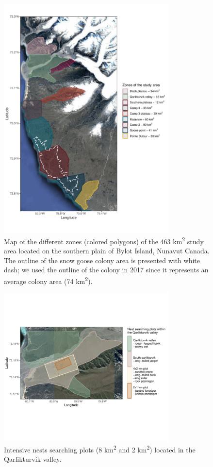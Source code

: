 \documentclass[a4paper,twoside,12pt]{article}
\begin{document}
\begin{figure}
\centering
  \includegraphics[width=0.8\textwidth, angle=0]{figures/zones_study_area.pdf}
   \caption{Map of the different zones (colored polygons) of the 463 km\textsuperscript{2} study area located on the southern plain of Bylot Island, Nunavut Canada. The outline of the snow goose colony area is presented with white dash; we used the outline of the colony in 2017 since it represents an average colony area (74 km\textsuperscript{2}).}
  \label{figure:zones}
\end{figure}
\begin{figure}
\centering
  \includegraphics[width=0.8\textwidth, angle=0]{figures/qarlikturvik_valley.pdf}
  \vspace{-70pt} %
  \caption{Intensive nests searching plots (8 km\textsuperscript{2} and 2 km\textsuperscript{2}) located in the Qarlikturvik valley.}
 \label{figure:qarlikturvik_valley}
\end{figure}
\newpage
\end{document}
